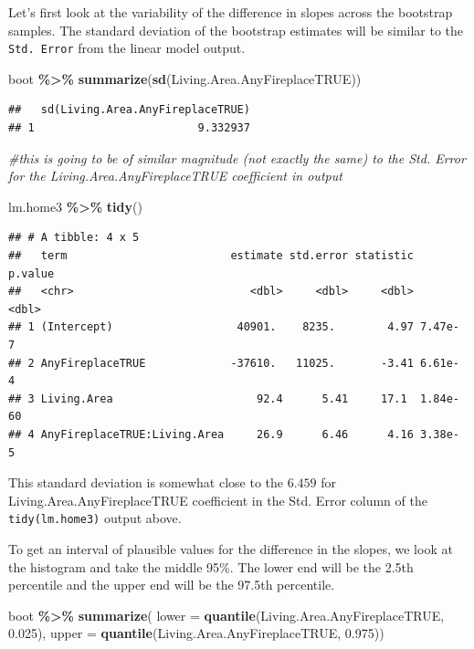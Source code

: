 \documentclass[
]{book}
\newenvironment{Shaded}{\begin{snugshade}}{\end{snugshade}}
\newcommand{\AttributeTok}[1]{\textcolor[rgb]{0.13,0.29,0.53}{#1}}
\newcommand{\CommentTok}[1]{\textcolor[rgb]{0.56,0.35,0.01}{\textit{#1}}}
\newcommand{\FloatTok}[1]{\textcolor[rgb]{0.00,0.00,0.81}{#1}}
\newcommand{\FunctionTok}[1]{\textcolor[rgb]{0.13,0.29,0.53}{\textbf{#1}}}
\newcommand{\NormalTok}[1]{#1}
\newcommand{\SpecialCharTok}[1]{\textcolor[rgb]{0.81,0.36,0.00}{\textbf{#1}}}
\begin{document}
Let's first look at the variability of the difference in slopes across the bootstrap samples. The standard deviation of the bootstrap estimates will be similar to the \texttt{Std.\ Error} from the linear model output.

\begin{Shaded}
\begin{Highlighting}[]
\NormalTok{boot }\SpecialCharTok{\%\textgreater{}\%}
  \FunctionTok{summarize}\NormalTok{(}\FunctionTok{sd}\NormalTok{(Living.Area.AnyFireplaceTRUE)) }
\end{Highlighting}
\end{Shaded}

\begin{verbatim}
##   sd(Living.Area.AnyFireplaceTRUE)
## 1                         9.332937
\end{verbatim}

\begin{Shaded}
\begin{Highlighting}[]
\CommentTok{\#this is going to be of similar magnitude (not exactly the same) to the Std. Error for the Living.Area.AnyFireplaceTRUE coefficient in output}

\NormalTok{lm.home3 }\SpecialCharTok{\%\textgreater{}\%}
  \FunctionTok{tidy}\NormalTok{()}
\end{Highlighting}
\end{Shaded}

\begin{verbatim}
## # A tibble: 4 x 5
##   term                         estimate std.error statistic  p.value
##   <chr>                           <dbl>     <dbl>     <dbl>    <dbl>
## 1 (Intercept)                   40901.    8235.        4.97 7.47e- 7
## 2 AnyFireplaceTRUE             -37610.   11025.       -3.41 6.61e- 4
## 3 Living.Area                      92.4      5.41     17.1  1.84e-60
## 4 AnyFireplaceTRUE:Living.Area     26.9      6.46      4.16 3.38e- 5
\end{verbatim}

This standard deviation is somewhat close to the \(6.459\) for Living.Area.AnyFireplaceTRUE coefficient in the Std. Error column of the \texttt{tidy(lm.home3)} output above.

To get an interval of plausible values for the difference in the slopes, we look at the histogram and take the middle 95\%. The lower end will be the 2.5th percentile and the upper end will be the 97.5th percentile.

\begin{Shaded}
\begin{Highlighting}[]
\NormalTok{boot }\SpecialCharTok{\%\textgreater{}\%}
  \FunctionTok{summarize}\NormalTok{(}
    \AttributeTok{lower =} \FunctionTok{quantile}\NormalTok{(Living.Area.AnyFireplaceTRUE, }\FloatTok{0.025}\NormalTok{), }
    \AttributeTok{upper =} \FunctionTok{quantile}\NormalTok{(Living.Area.AnyFireplaceTRUE, }\FloatTok{0.975}\NormalTok{))}
\end{Highlighting}
\end{Shaded}
\end{document}
